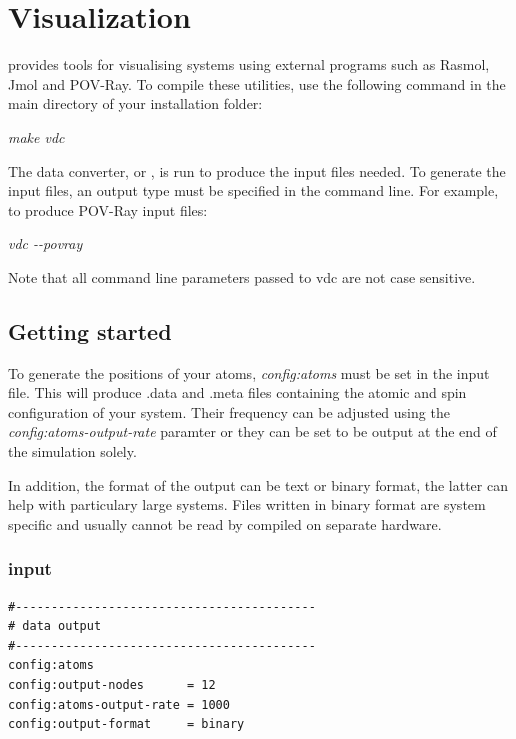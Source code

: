 \chapter{Visualization}\label{chap:visualization}

\vampire provides tools for visualising systems using external programs such as
Rasmol, Jmol and POV-Ray. To compile these utilities, use the following command
in the main directory of your \vampire installation folder:

\noindent
\begin{minipage}[c]{\textwidth}
\centering
\textit{make vdc}
\end{minipage}

The \vampire data converter, or \vdc, is run to produce the input files needed.
To generate the input files, an output type must be specified in the command line.
For example, to produce POV-Ray input files:

\noindent
\begin{minipage}[c]{\textwidth}
\centering
\textit{vdc -{}-povray}
\end{minipage}

Note that all command line parameters passed to vdc are not case sensitive.

\section*{Getting started}

To generate the positions of your atoms, \textit{config:atoms} must be set in
the input file. This will produce .data and .meta files containing the atomic
and spin configuration of your system. Their frequency can be adjusted using the
\textit{config:atoms-output-rate} paramter or they can be set to be output at
the end of the simulation solely.

In addition, the format of the output can be text or binary format, the latter
can help with particulary large systems. Files written in binary format are
system specific and usually cannot be read by \vdc compiled on separate
hardware.

\subsection*{input}
{\footnotesize
\begin{verbatim}
#------------------------------------------
# data output
#------------------------------------------
config:atoms
config:output-nodes      = 12
config:atoms-output-rate = 1000
config:output-format     = binary
\end{verbatim}
}

